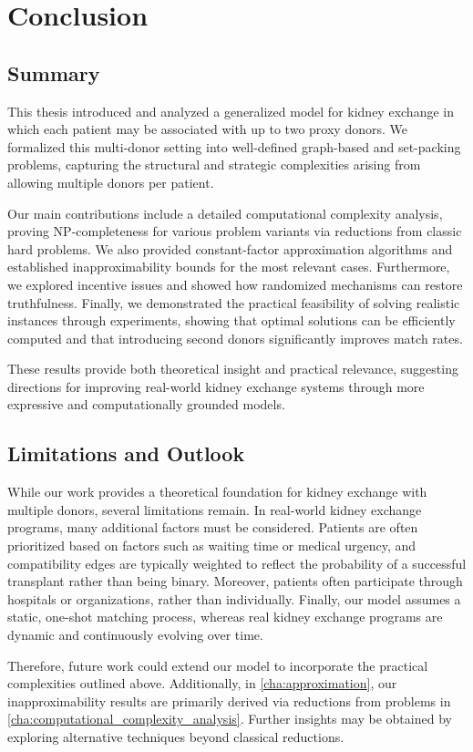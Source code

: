 \chapter{Conclusion}
\label{cha:conclusion}



\section{Summary}

This thesis introduced and analyzed a generalized model for kidney exchange in which each patient may be associated with up to two proxy donors. We formalized this multi-donor setting into well-defined graph-based and set-packing problems, capturing the structural and strategic complexities arising from allowing multiple donors per patient.

Our main contributions include a detailed computational complexity analysis, proving NP-completeness for various problem variants via reductions from classic hard problems. We also provided constant-factor approximation algorithms and established inapproximability bounds for the most relevant cases. Furthermore, we explored incentive issues and showed how randomized mechanisms can restore truthfulness. Finally, we demonstrated the practical feasibility of solving realistic instances through experiments, showing that optimal solutions can be efficiently computed and that introducing second donors significantly improves match rates.

These results provide both theoretical insight and practical relevance, suggesting directions for improving real-world kidney exchange systems through more expressive and computationally grounded models.


\section{Limitations and Outlook}

While our work provides a theoretical foundation for kidney exchange with multiple donors, several limitations remain. In real-world kidney exchange programs, many additional factors must be considered. Patients are often prioritized based on factors such as waiting time or medical urgency, and compatibility edges are typically weighted to reflect the probability of a successful transplant rather than being binary. Moreover, patients often participate through hospitals or organizations, rather than individually. Finally, our model assumes a static, one-shot matching process, whereas real kidney exchange programs are dynamic and continuously evolving over time.

Therefore, future work could extend our model to incorporate the practical complexities outlined above. Additionally, in \autoref{cha:approximation}, our inapproximability results are primarily derived via reductions from problems in \autoref{cha:computational_complexity_analysis}. Further insights may be obtained by exploring alternative techniques beyond classical reductions.



